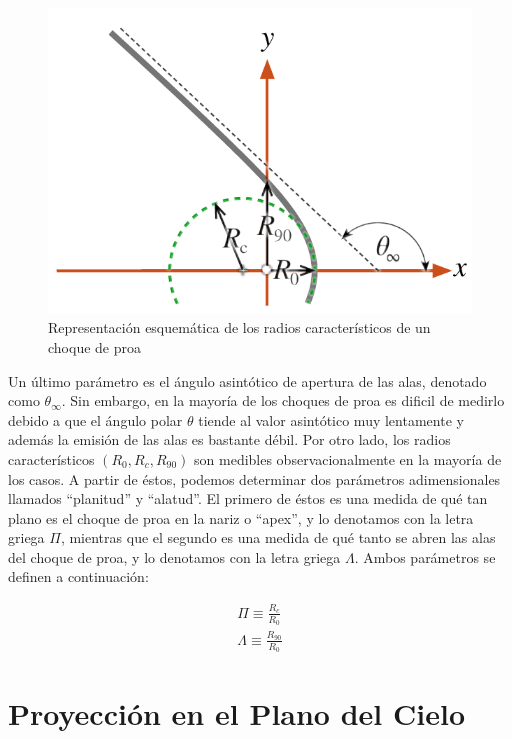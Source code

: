 \begin{figure}
  \includegraphics[width=0.5\linewidth]{./Figures/characteristic-radii}
  \caption{Representación esquemática de los radios característicos
    de un choque de proa}
  \label{fig:char-radii}
\end{figure}
Un último parámetro es el ángulo asintótico de apertura de las alas, denotado como $\theta_\infty$. Sin embargo, en la mayoría de los choques de proa es dificil de medirlo debido a que el ángulo polar $\theta$ tiende al valor asintótico muy lentamente y además la emisión de las alas es bastante débil. Por otro lado, los radios característicos $(R_0, R_c, R_{90})$ son medibles observacionalmente en la mayoría de los casos. A partir de éstos, podemos determinar dos parámetros adimensionales llamados ``planitud'' y ``alatud''. El primero de éstos es una medida de qué tan plano es el choque de proa en la nariz o ``apex'', y lo denotamos con la letra griega $\Pi$, mientras que el segundo es una medida de qué tanto se abren las alas del choque de proa, y lo denotamos con la letra griega $\Lambda$. Ambos parámetros se definen a continuación:

\begin{align}
  \Pi \equiv \frac{R_c}{R_0} \\
  \Lambda \equiv \frac{R_{90}}{R_0}
\end{align}

  

\section{Proyección en el Plano del Cielo}
\label{sec:projection}


